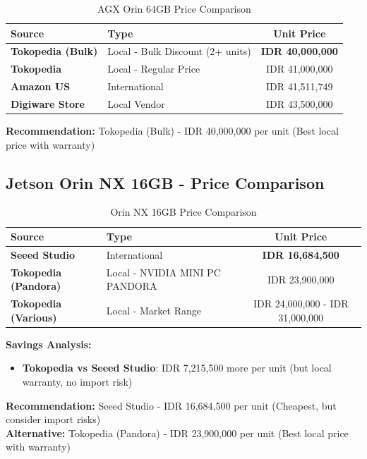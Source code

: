\documentclass[12pt,a4paper]{article}
\begin{document}
\begin{table}[h!]
\centering
\small
\begin{tabularx}{\textwidth}{l X c}
\toprule
\textbf{Source} & \textbf{Type} & \textbf{Unit Price} \\
\midrule
\textbf{Tokopedia (Bulk)} & Local - Bulk Discount (2+ units) & \textbf{IDR 40,000,000} \\
\textbf{Tokopedia} & Local - Regular Price & IDR 41,000,000 \\
\textbf{Amazon US} & International & IDR 41,511,749 \\
\textbf{Digiware Store} & Local Vendor & IDR 43,500,000 \\
\bottomrule
\end{tabularx}
\caption{AGX Orin 64GB Price Comparison}
\end{table}

\textbf{Recommendation:} Tokopedia (Bulk) - IDR 40,000,000 per unit (Best local price with warranty)

\subsection{Jetson Orin NX 16GB - Price Comparison}

\begin{table}[h!]
\centering
\small
\begin{tabularx}{\textwidth}{l X c}
\toprule
\textbf{Source} & \textbf{Type} & \textbf{Unit Price} \\
\midrule
\textbf{Seeed Studio} & International & \textbf{IDR 16,684,500} \\
\textbf{Tokopedia (Pandora)} & Local - NVIDIA MINI PC PANDORA & IDR 23,900,000 \\
\textbf{Tokopedia (Various)} & Local - Market Range & IDR 24,000,000 - IDR 31,000,000 \\
\bottomrule
\end{tabularx}
\caption{Orin NX 16GB Price Comparison}
\end{table}

\textbf{Savings Analysis:}
\begin{itemize}
    \item \textbf{Tokopedia vs Seeed Studio}: IDR 7,215,500 more per unit (but local warranty, no import risk)
\end{itemize}

\textbf{Recommendation:} Seeed Studio - IDR 16,684,500 per unit (Cheapest, but consider import risks)\\
\textbf{Alternative:} Tokopedia (Pandora) - IDR 23,900,000 per unit (Best local price with warranty)
\end{document}
